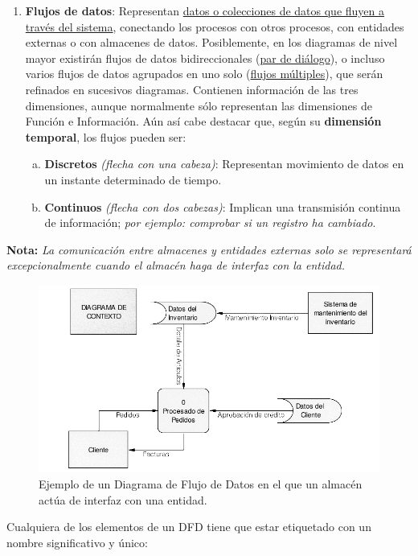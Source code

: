 \begin{enumerate}
    \item \textbf{Flujos de datos}: Representan \uline{datos o colecciones de datos que fluyen a través del sistema}, conectando los procesos con otros procesos, con entidades externas o con almacenes de datos. Posiblemente, en los diagramas de nivel mayor existirán flujos de datos bidireccionales (\uline{par de diálogo}), o incluso varios flujos de datos agrupados en uno solo (\uline{flujos múltiples}), que serán refinados en sucesivos diagramas. Contienen información de las tres dimensiones, aunque normalmente sólo representan las dimensiones de Función e Información. Aún así cabe destacar que, según su \textbf{dimensión temporal}, los flujos pueden ser:
          \begin{enumerate}[a.]
              \item \textbf{Discretos} \textit{(flecha con una cabeza)}: Representan movimiento de datos en un instante determinado de tiempo.
              \item \textbf{Continuos} \textit{(flecha con dos cabezas)}: Implican una transmisión continua de información; \textit{por ejemplo: comprobar si un registro ha cambiado}.
          \end{enumerate}
\end{enumerate}

\textbf{Nota:} \textit{La comunicación entre almacenes y entidades externas solo se representará excepcionalmente cuando el almacén haga de interfaz con la entidad.}

\begin{figure}[h!]
    \centering
    \includegraphics[width=0.8\linewidth]{Resources/Tema5/ejemploDFDInterfazAlmacen.png}
    \caption{Ejemplo de un Diagrama de Flujo de Datos en el que un almacén actúa de interfaz con una entidad.}
    \label{fig:ejemploDFDInterfazAlmacen}
\end{figure}

Cualquiera de los elementos de un DFD tiene que estar etiquetado con un nombre significativo y único:

